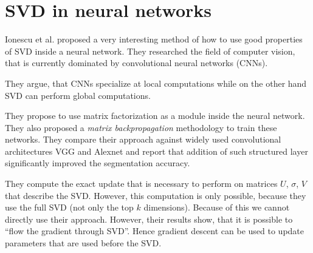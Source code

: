 \section{SVD in neural networks} \label{sec:nn:svd}
    Ionescu et al. \cite{ionescu2015training} %
    proposed a very interesting method of how to use good properties of SVD inside a neural network.
    They researched the field of computer vision, that is currently dominated by convolutional neural networks (CNNs).
    
    They argue, that CNNs specialize at local computations while on the other hand SVD can perform global computations.
    
    They propose to use matrix factorization as a module inside the neural network.
    They also proposed a \emph{matrix backpropagation} methodology to train these networks.
    They compare their approach against widely used convolutional architectures VGG and Alexnet and report that addition of such structured layer significantly improved the segmentation accuracy.
    
    They compute the exact update that is necessary to perform on matrices $U$, $\sigma$, $V$ that describe the SVD.
    However, this computation is only possible, because they use the full SVD (not only the top $k$ dimensions).
    Because of this we cannot directly use their approach.
    However, their results show, that it is possible to ``flow the gradient through SVD''.
    Hence gradient descent can be used to update parameters that are used before the SVD.
    
    